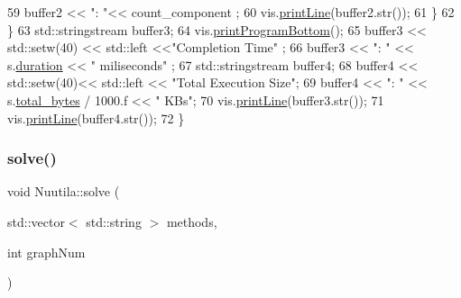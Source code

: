 \begin{DoxyCode}
59             buffer2 << \textcolor{stringliteral}{": "}<< count\_component ;
60             vis.\hyperlink{class_visualize_abce6cd538dc0715b21851e0bf0377d85}{printLine}(buffer2.str());
61         \}
62     \}
63             std::stringstream buffer3;
64         vis.\hyperlink{class_visualize_ac0be9ece2d80a7d1e34724fb87424216}{printProgramBottom}();
65         buffer3 << std::setw(40) << std::left <<\textcolor{stringliteral}{"Completion Time"} ;
66         buffer3 << \textcolor{stringliteral}{": "} << s.\hyperlink{struct_utility_structs_1_1_storage_items_a65e7df5611a4e144cc27576bd3041f6c}{duration} << \textcolor{stringliteral}{" miliseconds"} ;
67         std::stringstream buffer4;
68         buffer4 << std::setw(40)<< std::left << \textcolor{stringliteral}{"Total Execution Size"};
69         buffer4 << \textcolor{stringliteral}{": "} << s.\hyperlink{struct_utility_structs_1_1_storage_items_a39cf482db54d8e6ac473b438444c8a1e}{total\_bytes} / 1000.f << \textcolor{stringliteral}{" KBs"};
70         vis.\hyperlink{class_visualize_abce6cd538dc0715b21851e0bf0377d85}{printLine}(buffer3.str());
71         vis.\hyperlink{class_visualize_abce6cd538dc0715b21851e0bf0377d85}{printLine}(buffer4.str());
72 \}
\end{DoxyCode}
\mbox{\label{class_nuutila_ae56bd15d2e57366eef0e044bf3a37d9e}} 
\subsubsection{\texorpdfstring{solve()}{solve()}}
{\footnotesize\ttfamily void Nuutila\+::solve (\begin{DoxyParamCaption}\item[{std\+::vector$<$ std\+::string $>$}]{methods,  }\item[{int}]{graph\+Num }\end{DoxyParamCaption})}

\mbox{\label{class_nuutila_a2d43bc514d7375f9d63e60c06f90a60f}} 
